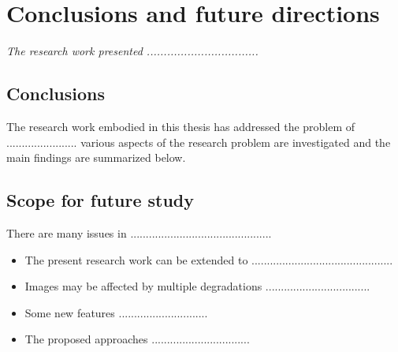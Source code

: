 \chapter{Conclusions and future directions}
\label{C7} %
\textit{The research work presented .................................}
\section{Conclusions}
The research work embodied in this thesis has addressed the problem of .......................
various aspects of the research problem are investigated and the main findings are summarized below.

\section{Scope for future study}
There are many issues in ..............................................
\begin{itemize}
	\item The present research work can be extended to ..............................................
	\item Images may be affected by multiple degradations ..................................
	\item Some new features .............................
	\item The proposed approaches ................................
	
\end{itemize}


